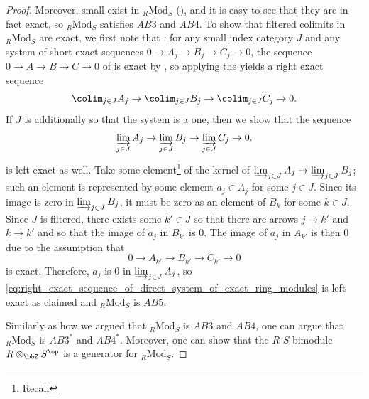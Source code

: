 \begin{proof}
    Moreover, small  exist in ${}_R \mathrm{Mod}_S$ (), and it is easy to see that they are in fact exact, so ${}_R \mathrm{Mod}_S$ satisfies $AB3$ and $AB4$. To show that filtered colimits in ${}_R \mathrm{Mod}_S$ are exact, we first note that    ; for any small index category $J$ and any system of short exact sequences $0 \to A_j \to B_j \to C_j \to 0$, the sequence $0 \to A \to B \to C \to 0$ of  is exact by , so applying the  yields a right exact sequence 
    $$\colim_{j \in J} A_j \to \colim_{j \in J} B_j \to \colim_{j \in J} C_j \to 0.$$ 
    If $J$ is additionally  so that the system is a  one, then we show that the sequence
    \begin{equation} \label{eq:right_exact_sequence_of_direct_system_of_exact_ring_modules}
    \varinjlim_{j \in J} A_j \to \varinjlim_{j \in J} B_j \to \varinjlim_{j \in J} C_j \to 0.
    \end{equation}
    is left exact as well. Take some element\footnote{Recall } of the kernel of $\varinjlim_{j \in J} A_j \to \varinjlim_{j \in J} B_j$; such an element is represented by some element $a_j \in A_j$ for some $j \in J$. Since its image is zero in $\varinjlim_{j \in J} B_j$, it must be zero as an element of $B_k$ for some $k \in J$. Since $J$ is filtered, there exists some $k' \in J$ so that there are arrows $j \to k'$ and $k \to k'$ and so that the image of $a_j$ in $B_{k'}$ is $0$. The image of $a_j$ in $A_{k'}$ is then $0$ due to the assumption that 
    $$0 \to A_{k'} \to B_{k'} \to C_{k'} \to 0$$
    is exact. Therefore, $a_j$ is $0$ in $\varinjlim_{j \in J} A_j$, so \eqref{eq:right_exact_sequence_of_direct_system_of_exact_ring_modules} is left exact as claimed and ${}_R \mathrm{Mod}_S$ is $AB5$.

    Similarly as how we argued that ${}_R \mathrm{Mod}_S$ is $AB3$ and $AB4$, one can argue that ${}_R \mathrm{Mod}_S$ is $AB3^*$ and $AB4^*$. Moreover, one can show that the $R$-$S$-bimodule $R \otimes_{\bbZ} S^{\op}$ is a generator for ${}_R \mathrm{Mod}_S$.
\end{proof}
